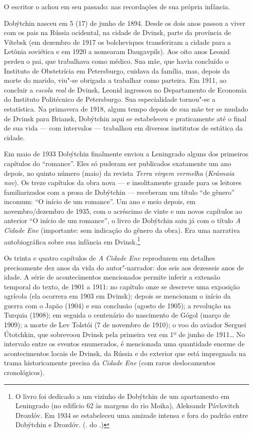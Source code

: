 O escritor o achou em seu passado: nas recordações de sua própria
infância.

Dobýtchin nasceu em 5 (17) de junho de 1894. Desde os dois anos passou a %
viver com os pais na Rússia ocidental, na cidade de Dvinsk, parte da
província de Vítebsk (em dezembro de 1917 os bolcheviques transferiram a
cidade para a Letônia soviética e em 1920 a nomearam Daugavpils). Aos
oito anos Leonid perdeu o pai, que trabalhava como médico. Sua mãe, que
havia concluído o Instituto de Obstetrícia em Petersburgo, cuidava da
família, mas, depois da morte do marido, viu"-se obrigada a trabalhar
como parteira. Em 1911, ao concluir a \emph{escola real} de Dvinsk,
Leonid ingressou no Departamento de Economia do Instituto Politécnico de
Petersburgo. Sua especialidade tornou"-se a estatística. Na primavera de
1918, algum tempo depois de sua mãe ter se mudado de Dvinsk para
Briansk, Dobýtchin aqui se estabeleceu e praticamente até o final de sua
vida --- com intervalos --- trabalhou em diversos institutos de estática %
da cidade.

Em maio de 1933 Dobýtchin finalmente enviou a Leningrado alguns dos
primeiros capítulos do ``romance''. Eles só puderam ser publicados
exatamente um ano depois, no quinto número (maio) da revista \emph{Terra
virgem vermelha} (\emph{Krásnaia nov}). Os treze capítulos da obra nova
--- e insolitamente grande para os leitores familiarizados com a prosa
de Dobýtchin --- receberam um título ``de gênero'' incomum: ``O início
de um romance''. Um ano e meio depois, em novembro/dezembro de 1935, com
o acréscimo de vinte e um novos capítulos ao anterior ``O início de um
romance'', o livro de Dobýtchin saiu já com o título \emph{A Cidade Ene}
(importante: sem indicação do gênero da obra). Era uma narrativa
autobiográfica sobre sua infância em Dvinsk.\footnote{O livro foi
  dedicado a um vizinho de Dobýtchin de um apartamento em Leningrado (no
  edifício 62 às margens do rio Moika), Aleksandr Pávlovitch Drozdóv. Em
  1934 se estabeleceu uma amizade intensa e fora do padrão entre
  Dobýtchin e Drozdóv. (\scalebox{.8}{N}. do \scalebox{.8}{A}.)}

Os trinta e quatro capítulos de \emph{A Cidade Ene} reproduzem em
detalhes precisamente dez anos da vida do autor"-narrador: dos seis aos
dezesseis anos de idade. A série de acontecimentos mencionados permite
inferir a extensão temporal do texto, de 1901 a 1911: no capítulo onze
se descreve uma exposição agrícola (ela ocorrera em 1903 em Dvinsk);
depois se mencionam o início da guerra com o Japão (1904) e sua
conclusão (agosto de 1905); a revolução na Turquia (1908); em seguida o
centenário do nascimento de Gógol (março de 1909); a morte de Lev
Tolstói (7 de novembro de 1910); o voo do aviador Serguei Útotchkin, que
sobrevoou Dvinsk pela primeira vez em 1º de junho de 1911\ldots{} No
intervalo entre os eventos enumerados, é mencionada uma quantidade
enorme de acontecimentos locais de Dvinsk, da Rússia e do exterior que
está impregnada na trama historicamente precisa da \emph{Cidade Ene} %
(com raros deslocamentos cronológicos).

